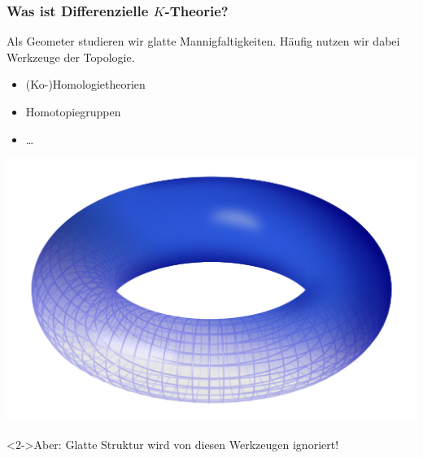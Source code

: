 \documentclass[12pt,utf8,notheorems,compress,t]{beamer}
\renewcommand{\_}{\mathpunct{.}}
\newcommand{\?}{\,{:}\,}
\begin{document}
\begin{frame}\frametitle{Was ist Differenzielle $K$-Theorie?}
    Als Geometer studieren wir glatte Mannigfaltigkeiten. Häufig nutzen wir
    dabei Werkzeuge der Topologie.
    \begin{minipage}{0.6\linewidth}
        \vspace{1em}
        \begin{itemize}
            \item (Ko-)Homologietheorien
            \item Homotopiegruppen
            \item \dots
        \end{itemize}
    \end{minipage}
    \begin{minipage}{0.3\linewidth}
        \vspace{1.5em}
        \includegraphics[scale=0.2]{512px-Torus}	
    \end{minipage}
    \vspace{1em}
    \begin{alertblock}<2->{Aber:}
        Glatte Struktur wird von diesen Werkzeugen ignoriert!
    \end{alertblock}
\end{frame}
\end{document}
